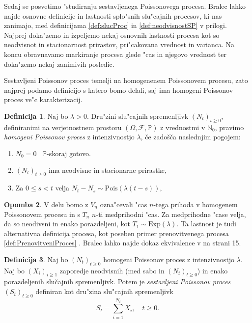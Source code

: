 \documentclass[12pt, a4paper, reqno]{amsart}
\theoremstyle{definition}
\newtheorem{definicija}{Definicija}[section]
\newtheorem{opomba}[definicija]{Opomba}
\theoremstyle{plain}
\newcommand{\N}{\mathbb{N}}
\newcommand{\Prob}{\mathbb{P}}
\newcommand{\1}{\mathds{1}}
\newcommand{\Pois}[1]{\text{Pois}(#1)}
\newcommand*{\refPriloga}[1]{%
  \begingroup
    \hypersetup{
      linkcolor=red,
      linkbordercolor=red,
    }%
    \ref{#1}%
  \endgroup
}
\begin{document}
    Sedaj se posvetimo "studiranju sestavljenega Poissonovega procesa. Bralec lahko najde 
    osnovne definicije in lastnosti splo"snih slu"cajnih procesov, ki nas zanimajo, 
     med definicijama \refPriloga{def:slucProc} in \refPriloga{def:neodvisnostSP} v prilogi.
    Najprej doka"zemo in izpeljemo nekaj osnovnih lastnosti procesa kot so neodvisnot in stacionarnost
    prirastov, pri"cakovana vrednost in varianca. Na koncu obravnavamo markiranje procesa glede "cas in 
    njegovo vrednost ter doka"zemo nekaj zanimivih posledic.

    Sestavljeni Poissonov proces temelji na homogenenem Poissonovem procesu, zato najprej podamo definicijo 
    s katero bomo delali, saj ima homogeni Poissonov proces ve"c karakterizacij. 

    \begin{definicija}
        Naj bo $\lambda > 0$. Dru"zini slu"cajnih spremenljivk $(N_t)_{t\geq 0}$, definiranimi na verjetnostnem 
        prostoru $(\Omega, \mathcal{F}, \mathbb{P})$ z vrednostmi v $\N_0$, pravimo 
        \textit{homogeni Poissonov proces} z intenzivnostjo $\lambda$, če zadošča naslednjim pogojem:
        \begin{enumerate}
            \item $N_0 = 0$ \ $\Prob$-skoraj gotovo.
            \item $(N_t)_{t\geq 0}$ ima neodvisne in stacionarne prirastke,
            \item Za $0 \leq s < t$ velja $ N_t - N_s \sim\Pois{\lambda(t - s)}$,
        \end{enumerate}
        \label{def:HPP}
    \end{definicija}

    \begin{opomba}
    V delu bomo z $V_n$ ozna"cevali "cas $n$-tega prihoda v homogenem Poissonovem procesu in s $T_n$ $n$-ti 
    medprihodni "cas. Za medprihodne "case velja, da so neodivsni in enako porazdeljeni, kot 
    $T_1 \sim \text{Exp}(\lambda)$. Ta lastnost je tudi alternativna definicija procesa, kot poseben 
    primer prenovitvenega procesa \refPriloga{def:PrenovitveniProces}. Bralec 
    lahko najde dokaz ekvivalence v \cite{10} na strani 15.
    \end{opomba}

    \begin{definicija}
        Naj bo $(N_t)_{t\geq0}$ homogeni Poissonov proces z intenzivnostjo $\lambda$. 
        Naj bo $(X_i)_{i\geq1}$ zaporedje neodvisnih (med sabo in $(N_t)_{t\geq0}$) in enako 
        porazdeljenih slučajnih spremenljivk. Potem je 
        \textit{sestavljeni Poissonov proces} $(S_t)_{t\geq0}$ definiran kot dru"zina
        slu"cajnih spremenljivk
        $$
            S_t = \sum_{i=1}^{N_t} X_i, \quad t\geq0.
        $$
        \label{def:CPP}
    \end{definicija}
\end{document}
